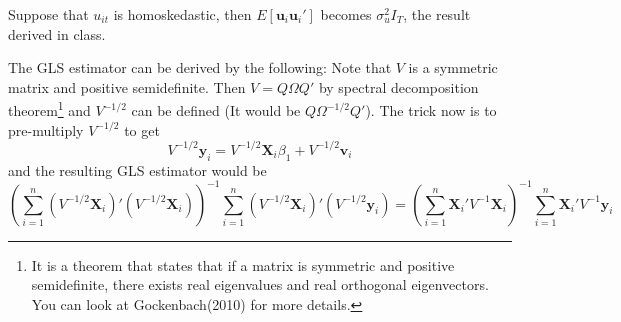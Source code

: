 \documentclass[12pt]{article}
\theoremstyle{definition}
\theoremstyle{property}
\theoremstyle{assumption}
\theoremstyle{example}
\theoremstyle{comment}
\newtheorem{comment}{Comment}[section]
\begin{document}
Suppose that $u_{it}$ is homoskedastic, then $E[ \mathbf{u}_i\mathbf{u}_i' ]$ becomes $\sigma_u^2 I_T$, the result derived in class. \par
The GLS estimator can be derived by the following: Note that $V$ is a symmetric matrix and positive semidefinite. Then $V=Q\Omega Q'$ by spectral decomposition theorem\footnote{It is a theorem that states that if a matrix is symmetric and positive semidefinite, there exists real eigenvalues and real orthogonal eigenvectors. You can look at Gockenbach(2010) for more details. } and $V^{-1/2}$ can be defined (It would be $Q\Omega^{-1/2}Q'$). The trick now is to pre-multiply $V^{-1/2}$ to get
\[
V^{-1/2}\mathbf{y}_ i = V^{-1/2}\mathbf{X}_i\beta_1 + V^{-1/2}\mathbf{v}_i
\]
and the resulting GLS estimator would be
\[
\left(\sum_{i=1}^n (V^{-1/2}\mathbf{X}_i)'(V^{-1/2}\mathbf{X}_i)\right)^{-1}\sum_{i=1}^n (V^{-1/2}\mathbf{X}_i)'(V^{-1/2}\mathbf{y}_i)=\left(\sum_{i=1}^n \mathbf{X}_i'V^{-1}\mathbf{X}_i\right)^{-1}\sum_{i=1}^n \mathbf{X}_i'V^{-1}\mathbf{y}_i
\]
\begin{mdframed}[backgroundcolor=yellow!5] 
\begin{comment}[So when do we use fixed effects vs. random effects?]
One way of figuring out when to use random effect is through a Hausmann Test. Random effects can be considered as a special case of fixed effects. In this test, the null hypothesis would be random effects and the alternative would be fixed effects. Note that the ingredients we have here are similar to the Hausmann Test in the endogeneity test. Random effects estimators would only be consistent if $H_0$ is true whereas fixed effects are consistent in both $H_0$ and $H_1$. If you are planning to use the random
effects estimator (and believe that the random effects assumptions are appropriate in your context), the Hausmann test can be used as a specification check for this assumption and provide evidence to support your approach.
\end{comment}
\end{mdframed}
\newpage
\end{document}
